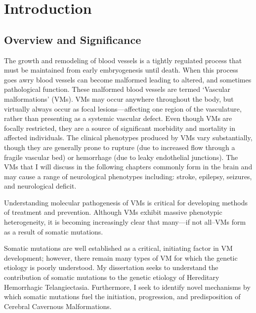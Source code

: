 \chapter{Introduction}
\label{chap:intro}

\clearpage

\section{Overview and Significance}
The growth and remodeling of blood vessels is a tightly regulated process that must be maintained from early embryogenesis until death. When this process goes awry blood vessels can become malformed leading to altered, and sometimes pathological function. These malformed blood vessels are termed `Vascular malformations' (VMs). VMs may occur anywhere throughout the body, but virtually always occur as focal lesions---affecting one region of the vasculature, rather than presenting as a systemic vascular defect. Even though VMs are focally restricted, they are a source of significant morbidity and mortality in affected individuals. The clinical phenotypes produced by VMs vary substantially, though they are generally prone to rupture (due to increased flow through a fragile vascular bed) or hemorrhage (due to leaky endothelial junctions). The VMs that I will discuss in the following chapters commonly form in the brain and may cause a range of neurological phenotypes including: stroke, epilepsy, seizures, and neurological deficit.

Understanding molecular pathogenesis of VMs is critical for developing methods of treatment and prevention. Although VMs exhibit massive phenotypic heterogeneity, it is becoming increasingly clear that many---if not all--VMs form as a result of somatic mutations.

Somatic mutations are well established as a critical, initiating factor in VM development; however, there remain many types of VM for which the genetic etiology is poorly understood. My dissertation seeks to understand the contribution of somatic mutations to the genetic etiology of Hereditary Hemorrhagic Telangiectasia. Furthermore, I seek to identify novel mechanisms by which somatic mutations fuel the initiation, progression, and predisposition of Cerebral Cavernous Malformations. 

